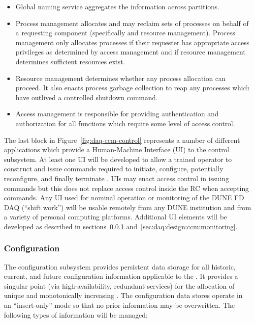 \begin{itemize}
\item Global naming service aggregates the  information across
  partitions.  

\item Process management allocates and may reclaim sets of processes on behalf
  of a requesting component (specifically  and resource management). 
  Process management only allocates processes if their requester has appropriate
  access privileges as determined by access management and if resource
  management determines sufficient resources exist. 
  
\item Resource management determines whether any process allocation can proceed.
  It also enacts process garbage collection to reap any processes which have
  outlived a controlled shutdown command.

\item Access management is responsible for providing authentication and
  authorization for all  functions which require some level of access
  control. 

\end{itemize}

The last block in Figure~\ref{fig:daq-ccm-control} represents a number of
different applications which provide a Human-Machine Interface (UI) to the
control subsystem.
At least one UI will be developed to allow a trained operator to construct and
issue commands required to initiate, configure, potentially reconfigure, and
finally terminate . 
UIs may enact access control in issuing commands but this does not replace
access control inside the RC when accepting commands.
Any UI used for nominal operation or monitoring of the DUNE FD DAQ (``shift
work'') will be usable remotely from any DUNE institution and from a variety of
personal computing platforms.  
Additional UI elements will be developed as described in
sections~\ref{sec:daq:design:ccm:configuration}
and~\ref{sec:daq:design:ccm:monitoring}.


\subsubsection{Configuration}
\label{sec:daq:design:ccm:configuration}

The  configuration subsystem provides persistent data storage for all
historic, current, and future configuration information applicable to the
.
It provides a singular point (via high-availability, redundant services) for the
allocation of unique and monotonically increasing .
The configuration data stores operate in an ``insert-only'' mode so that no
prior information may be overwritten. 
The following types of information will be managed:

